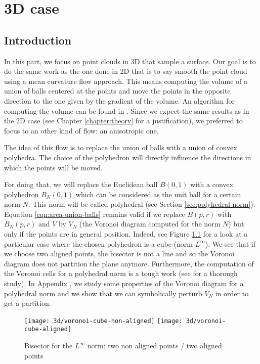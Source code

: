 \chapter{3D case}
\label{chapter:3d}

\section{Introduction}

In this part, we focus on point clouds in 3D that sample a surface. Our goal is
to do the same work as the one done in 2D that is to say smooth the point cloud
using a mean curvature flow approach. This means computing the volume of a union
of balls centered at the points and move the points in the opposite direction to
the one given by the gradient of the volume. An algorithm for computing the
volume can be found in \cite{cazals2011computing}. Since we expect the same
results as in the 2D case (see Chapter \ref{chapter:theory} for a
justification), we preferred to focus to an other kind of flow: an anisotropic
one.

The idea of this flow is to replace the union of balls with a union of convex
polyhedra. The choice of the polyhedron will directly influence the directions
in which the points will be moved.

For doing that, we will replace the Euclidean ball $ B(0, 1) $ with a convex
polyhedron $ B_N(0, 1) $ which can be considered as the unit ball for a certain
norm $ N $. This norm will be called polyhedral (see Section
\ref{sec:polyhedral-norm}). Equation \eqref{eqn:area-union-balls} remains valid if
we replace $ B(p, r) $ with $ B_N(p, r) $ and $ V $ by $ V_N $ (the Voronoi
diagram computed for the norm $ N $) but only if the points are in general
position. Indeed, see Figure \ref{fig:3d-voronoi-cube} for a look at a
particular case where the chosen polyhedron is a cube (norm $ L^\infty $). We
see that if we choose two aligned points, the bisector is not a line and so the
Voronoi diagram does not partition the plane anymore. Furthermore, the
computation of the Voronoi cells for a polyhedral norm is a tough work (see
\cite{ma2000bisectors} for a thorough study). In Appendix
, we study some properties of the
Voronoi diagram for a polyhedral norm and we show that we can symbolically
perturb $ V_N $ in order to get a partition.

\begin{figure}[h]
    \centering

    \texttt{[image: 3d/voronoi-cube-non-aligned]}
    \hspace{2cm}
    \texttt{[image: 3d/voronoi-cube-aligned]}
    \caption{Bisector for the $ L^\infty $ norm: two non aligned points / two
        aligned points}
    \label{fig:3d-voronoi-cube}
\end{figure}

